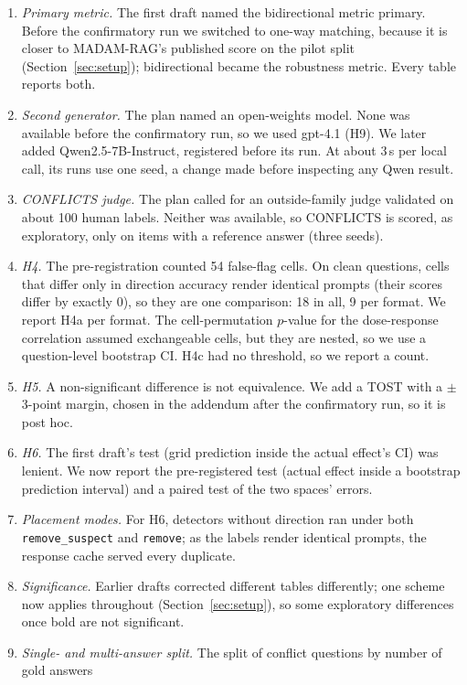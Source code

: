 \begin{enumerate}[leftmargin=*,itemsep=1pt,topsep=2pt]
\item \emph{Primary metric.} The first draft named the bidirectional metric primary. Before
the confirmatory run we switched to one-way matching, because it is closer to MADAM-RAG's published score on the pilot
split (Section~\ref{sec:setup}); bidirectional became the robustness metric. Every table reports both.
\item \emph{Second generator.} The plan named an open-weights model. None was available before the confirmatory run, so
we used gpt-4.1 (H9). We later added Qwen2.5-7B-Instruct, registered before its run. At about 3\,s per local
call, its runs use one seed, a change made before inspecting any Qwen result.
\item \emph{CONFLICTS judge.} The plan called for an outside-family judge validated on about 100 human
labels. Neither was available, so CONFLICTS is scored, as exploratory, only on items with a reference answer
(three seeds).
\item \emph{H4.} The pre-registration counted 54 false-flag cells. On clean questions, cells that differ only in
direction accuracy render identical prompts (their scores differ by exactly 0), so they are one comparison: 18 in
all, 9 per format. We report H4a per format. The cell-permutation $p$-value for the dose-response correlation assumed
exchangeable cells, but they are nested, so we use a question-level bootstrap CI. H4c had no threshold,
so we report a count.
\item \emph{H5.} A non-significant difference is not equivalence. We add a TOST with a $\pm$3-point margin, chosen in
the addendum after the confirmatory run, so it is post hoc.
\item \emph{H6.} The first draft's test (grid prediction inside the actual effect's CI) was
lenient. We now report the pre-registered test (actual effect inside a bootstrap prediction interval) and a paired test
of the two spaces' errors.
\item \emph{Placement modes.} For H6, detectors without direction ran under both
\texttt{remove\_suspect} and \texttt{remove}; as the labels render identical prompts, the response cache served every
duplicate.
\item \emph{Significance.} Earlier drafts corrected different tables differently; one scheme now applies
throughout (Section~\ref{sec:setup}), so some exploratory differences once bold are
not significant.
\item \emph{Single- and multi-answer split.} The split of conflict questions by number of gold answers

\end{enumerate}
